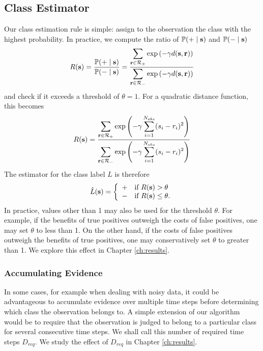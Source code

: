 \subsection{Class Estimator}
Our class estimation rule is simple: assign to the observation the class with the
highest probability. In practice, we compute the ratio of $\mathbb{P}(+ \;|\; \mathbf s)$
and $\mathbb{P}(- \;|\; \mathbf s)$ 
\begin{gather}
R(\mathbf s) = \frac{\mathbb{P}(+ \;|\; \mathbf s)}{\mathbb{P}(- \;|\; \mathbf s)} = \frac{\displaystyle \sum_{\mathbf r \in \mathcal{R}_+} \exp \left(-\gamma d(\mathbf s,\mathbf r)\right)}{\displaystyle \sum_{\mathbf r \in \mathcal{R}_-} \exp \left(-\gamma d(\mathbf s,\mathbf r)\right)}
\end{gather}
and check if it exceeds a threshold of $\theta = 1$. For a quadratic distance function, this becomes
\begin{gather}
R(\mathbf s) = \frac{\displaystyle \sum_{\mathbf r \in \mathcal{R}_+} \exp \left(-\gamma \displaystyle \sum_{i=1}^{N_{obs}} (s_i - r_i)^2\right)}{\displaystyle \sum_{\mathbf r \in \mathcal{R}_-} \exp \left(-\gamma \displaystyle \sum_{i=1}^{N_{obs}} (s_i - r_i)^2\right)}
\end{gather}
The estimator for the class label $L$ is therefore
\begin{gather}
\hat{L}(\mathbf s) = \left\{
\begin{array}{ll}
+ & \text{if } R(\mathbf s) > \theta\\
- & \text{if } R(\mathbf s) \leq \theta.
\end{array}
\right.
\end{gather}
In practice, values other than 1 may also be used for the threshold $\theta$. For
example, if the benefits of true positives outweigh the costs of false
positives, one may set $\theta$ to less than 1. On the other hand, if the
costs of false positives outweigh the benefits of true positives, one may
conservatively set $\theta$ to greater than 1. We explore this effect in
Chapter \ref{ch:results}.

\subsubsection{Accumulating Evidence}
In some cases, for example when dealing with noisy data, it could be
advantageous to accumulate evidence over multiple time steps before determining
which class the observation belongs to. A simple extension of our algorithm
would be to require that the observation is judged to belong to a particular
class for several consecutive time steps. We shall call this number of required
time steps $D_{req}$. We study the effect of $D_{req}$ in Chapter \ref{ch:results}.

